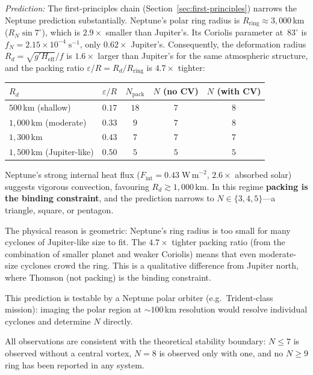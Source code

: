 \textit{Prediction:}
The first-principles chain (Section~\ref{sec:first-principles})
narrows the Neptune prediction substantially.  Neptune's polar
ring radius is $R_{\mathrm{ring}} \approx 3{,}000$\,km
($R_N \sin 7^\circ$), which is $2.9\times$ smaller than Jupiter's.
Its Coriolis parameter at~$83^\circ$ is $f_N = 2.15\times
10^{-4}\;\mathrm{s}^{-1}$, only $0.62\times$ Jupiter's.
Consequently, the deformation radius
$R_d = \sqrt{g' H_{\mathrm{eff}}}/f$ is $1.6\times$ larger than
Jupiter's for the same atmospheric structure, and the packing ratio
$\varepsilon/R = R_d/R_{\mathrm{ring}}$ is $4.7\times$ tighter:
\begin{center}
\begin{tabular}{lcccc}
\toprule
$R_d$ & $\varepsilon/R$ & $N_{\mathrm{pack}}$ &
$N$ (no CV) & $N$ (with CV) \\
\midrule
$500$\,km (shallow) & $0.17$ & $18$ & $7$ & $8$ \\
$1{,}000$\,km (moderate) & $0.33$ & $9$ & $7$ & $8$ \\
$1{,}300$\,km & $0.43$ & $7$ & $7$ & $7$ \\
$1{,}500$\,km (Jupiter-like) & $0.50$ & $5$ & $5$ & $5$ \\
\bottomrule
\end{tabular}
\end{center}
Neptune's strong internal heat flux ($F_{\mathrm{int}} = 0.43\;
\mathrm{W\,m}^{-2}$, $2.6\times$ absorbed solar) suggests vigorous
convection, favouring $R_d \gtrsim 1{,}000$\,km.  In this regime
\textbf{packing is the binding constraint}, and the prediction
narrows to $N \in \{3, 4, 5\}$---a triangle, square, or pentagon.

The physical reason is geometric: Neptune's ring radius is too small
for many cyclones of Jupiter-like size to fit.  The $4.7\times$
tighter packing ratio (from the combination of smaller planet and
weaker Coriolis) means that even moderate-size cyclones crowd the
ring.  This is a qualitative difference from Jupiter north, where
Thomson (not packing) is the binding constraint.

This prediction is testable by a Neptune polar orbiter (e.g.\
Trident-class mission): imaging the polar region at
$\sim\!100$\,km resolution would resolve individual cyclones and
determine $N$ directly.

All observations are consistent with the theoretical stability
boundary: $N \le 7$ is observed without a central vortex, $N = 8$
is observed only with one, and no $N \ge 9$ ring has been reported
in any system.


